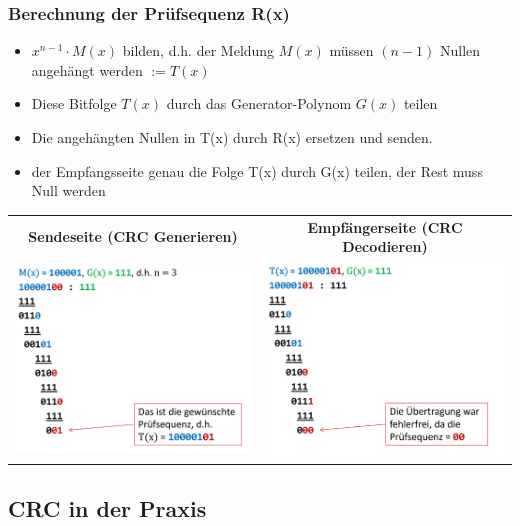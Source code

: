 \subsubsection{Berechnung der Prüfsequenz R(x)}
\begin{itemize}
	\item $x^{n-1} \cdot M(x)$ bilden, d.h. der Meldung $M(x)$ müssen $(n-1)$ Nullen angehängt werden $:= T(x)$ 
	\item Diese Bitfolge $T(x)$ durch das Generator-Polynom $G(x)$ teilen
	\item Die angehängten Nullen in T(x) durch R(x) ersetzen und senden.
	\item der Empfangsseite genau die Folge T(x) durch G(x) teilen, der Rest muss Null werden	
\end{itemize}

\begin{tabular}{c|c}
	\textbf{Sendeseite (CRC Generieren)} & \textbf{Empfängerseite (CRC Decodieren)} \\ 
	\includegraphics[width=7cm]{images/CRC/crc-gen.png} & \includegraphics[width=7cm]{images/CRC/crc-enc.png}  \\ 
\end{tabular} 

\subsection{CRC in der Praxis}

